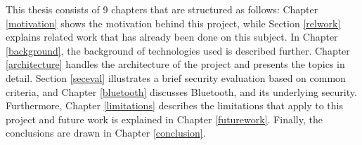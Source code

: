 This thesis consists of 9 chapters that are structured as follows: Chapter \ref{motivation} shows the motivation behind this project, while Section \ref{relwork} explains related work that has already been done on this subject. In Chapter \ref{background}, the background of technologies used is described further. Chapter \ref{architecture} handles the architecture of the project and presents the topics in detail. Section \ref{seceval} illustrates a brief security evaluation based on common criteria, and Chapter \ref{bluetooth} discusses Bluetooth, and its underlying security. Furthermore, Chapter \ref{limitations} describes the limitations that apply to this project and future work is explained in Chapter \ref{futurework}. Finally, the conclusions are drawn in Chapter \ref{conclusion}.


